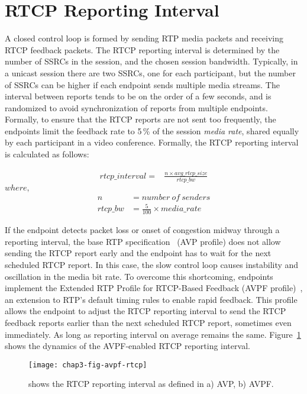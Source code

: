 \section{RTCP Reporting Interval}

A closed control loop is formed by sending RTP media packets and receiving
RTCP feedback packets. The RTCP reporting interval is determined by the number
of SSRCs in the session, and the chosen session bandwidth. Typically, in a
unicast session there are two SSRCs, one for each participant, but the number
of SSRCs can be higher if each endpoint sends multiple media streams. The
interval between reports tends to be on the order of a few seconds, and is
randomized to avoid synchronization of reports from multiple endpoints.
Formally, to ensure that the RTCP reports are not sent too frequently, the
endpoints limit the feedback rate to 5\,\% of the session \textit{media rate},
shared equally by each participant in a video conference. Formally, the RTCP
reporting interval is calculated as follows:

\begin{align}
rtcp\_interval = & \frac{n \times avg\_rtcp\_size}{rtcp\_bw}
\label{eq:rtcp.int}
\end{align}
\hspace{35mm}$where,$
\begin{align*}
n &=  number\ of\ senders \\
rtcp\_bw &=  \frac{5}{100} \times media\_rate
\end{align*}



If the endpoint detects packet loss or onset of congestion midway through a
reporting interval, the base RTP specification~\cite{rfc3550} (AVP profile)
does not allow sending the RTCP report early and the endpoint has to wait for
the next scheduled RTCP report. In this case, the slow control loop causes
instability and oscillation in the media bit rate. To overcome this
shortcoming, endpoints implement the Extended RTP Profile for RTCP-Based
Feedback (AVPF profile)~\cite{rfc4585}, an extension to RTP's default timing
rules to enable rapid feedback. This profile allows the endpoint to adjust the
RTCP reporting interval to send the RTCP feedback reports earlier than the
next scheduled RTCP report, sometimes even immediately. As long as reporting
interval on average remains the same. Figure~\ref{fig:3:avpf.interval} shows
the dynamics of the AVPF-enabled RTCP reporting interval.

\begin{figure}[!h]
\centerline{\texttt{[image: chap3-fig-avpf-rtcp]}}
\caption{shows the RTCP reporting interval as defined in a) AVP, b) AVPF.}
\label{fig:3:avpf.interval}
\end{figure}


